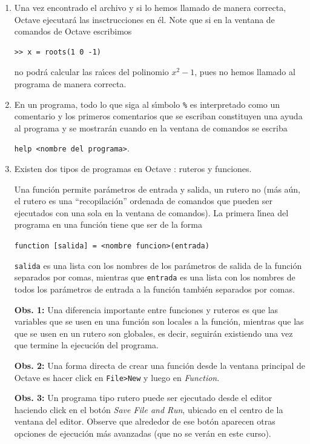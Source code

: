 \documentclass[letter,11pt]{article}
\newcommand\0{\mathbf{0}}
\newcommand{\octave}{{\sc Octave }}
\begin{document}
\begin{enumerate}
Si el programa no se encuentra en el directorio de b\'usqueda, \octave lo buscar\'a en el directorio de trabajo actual, el cual se puede ver en la barra superior de la ventana principal de \octave. En estas ventanas podemos cambiar y navegar por los directorios (tambi\'en podemos verlos y cambiarlos con \Verb+cd+).

\item Una vez encontrado el archivo y si lo hemos llamado de manera correcta, \octave ejecutar\'a las insctrucciones en \'el.
Note que si en la ventana de comandos de \octave  escribimos

\medskip
\begin{lstlisting}		
>> x = roots(1 0 -1)
\end{lstlisting}
\medskip

\noindent \octave no podr\'a calcular las ra\'{\i}ces del polinomio $x^2 -1$, pues no hemos llamado al programa de manera correcta.

\item En un programa, todo lo que siga al s\'{\i}mbolo \Verb+%+ 
es interpretado como un comentario y los primeros comentarios que se escriban constituyen una ayuda al programa y se mostrar\'an cuando en la ventana de comandos se escriba

\Verb+help <nombre del programa>+.

\item Existen dos tipos de programas en \octave: ruteros y funciones. 

Una funci\'on permite par\'ametros de entrada y salida, un rutero no (m\'as a\'un, el rutero es una ``recopilaci\'on''  ordenada de comandos que pueden ser ejecutados con una sola en la ventana de comandos). La primera l\'{\i}nea del programa en una funci\'on tiene que ser de la forma

\Verb+function [salida] = <nombre funcion>(entrada)+

\noindent \Verb+salida+ es una lista con los nombres de los par\'ametros de salida de la funci\'on separados por comas, mientras que \Verb+entrada+ es una lista con los nombres de todos los par\'ametros de entrada a la funci\'on tambi\'en separados por comas.			

\textbf{Obs. 1:} Una diferencia importante entre funciones y ruteros es que las variables que se usen en una funci\'on son locales a la funci\'on, mientras que las que se usen en un rutero son globales, es decir, seguir\'an existiendo una vez que termine la ejecuci\'on del programa.	

\textbf{Obs. 2:} Una forma directa de crear una funci\'on desde la ventana principal de \octave{} es hacer click en \verb"File>New" y luego en \emph{Function}.

\textbf{Obs. 3:} Un programa tipo rutero puede ser  ejecutado desde el editor haciendo click en el bot\'on \emph{Save File and Run}, ubicado en el centro de la ventana del editor. Observe que alrededor de ese bot\'on aparecen otras opciones de ejecuci\'on m\'as avanzadas (que no se ver\'an en este curso). 

\end{enumerate}	
\end{document}
